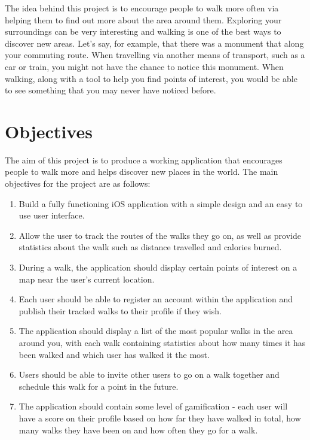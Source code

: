 

The idea behind this project is to encourage people to walk more often via helping them to find out more about the area around them. Exploring your surroundings can be very interesting and walking is one of the best ways to discover new areas. Let's say, for example, that there was a monument that along your commuting route. When travelling via another means of transport, such as a car or train, you might not have the chance to notice this monument. When walking, along with a tool to help you find points of interest, you would be able to see something that you may never have noticed before. 


\section{Objectives} \label{section:objectives}

The aim of this project is to produce a working application that encourages people to walk more and helps discover new places in the world. The main objectives for the project are as follows:

\begin{enumerate}[label=\textbf{Obj \arabic*}]
    \item Build a fully functioning iOS application with a simple design and an easy to use user interface.
    \item Allow the user to track the routes of the walks they go on, as well as provide statistics about the walk such as distance travelled and calories burned.
    \item During a walk, the application should display certain points of interest on a map near the user's current location.
    \item Each user should be able to register an account within the application and publish their tracked walks to their profile if they wish.
    \item The application should display a list of the most popular walks in the area around you, with each walk containing statistics about how many times it has been walked and which user has walked it the most.
    \item Users should be able to invite other users to go on a walk together and schedule this walk for a point in the future.
    \item The application should contain some level of gamification - each user will have a score on their profile based on how far they have walked in total, how many walks they have been on and how often they go for a walk.
\end{enumerate}






